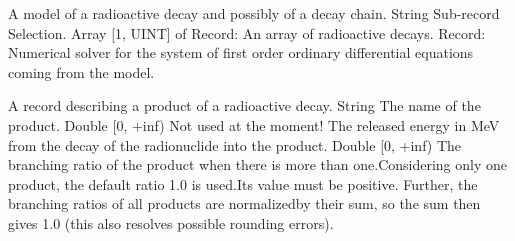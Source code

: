 \begin{RecordType}
	{}
	{} %
	{} %
	{} %
	{{{A model of a radioactive decay and possibly of a decay chain.}}}
		\KeyItem
			{}
			{{String}}
			{\textrangle}
			{} %
			{{{Sub-record Selection.}}}
		\KeyItem
			{}
			{{Array [1, UINT] of }{Record}{: }}
			{\textrangle}
			{} %
			{{{An array of radioactive decays.}}}
		\KeyItem
			{}
			{{Record}{: }}
			{\textlangle{ \it{{\{}{\}}} }\textrangle}
			{} %
			{{{Numerical solver for the system of first order ordinary differential equations coming from the model.}}}
\end{RecordType}
\begin{RecordType}
	{}
	{} %
	{} %
	{} %
	{{{A record describing a product of a radioactive decay.}}}
		\KeyItem
			{}
			{{String}}
			{\textrangle}
			{} %
			{{{The name of the product.}}}
		\KeyItem
			{}
			{{Double [0, +inf)}}
			{\textrangle}
			{} %
			{{{Not used at the moment! The released energy in MeV from the decay of the radionuclide into the product.}}}
		\KeyItem
			{}
			{{Double [0, +inf)}}
			{\textrangle}
			{} %
			{{{The branching ratio of the product when there is more than one.Considering only one product, the default ratio 1.0 is used.Its value must be positive. Further, the branching ratios of all products are normalizedby their sum, so the sum then gives 1.0 (this also resolves possible rounding errors).}}}
\end{RecordType}
